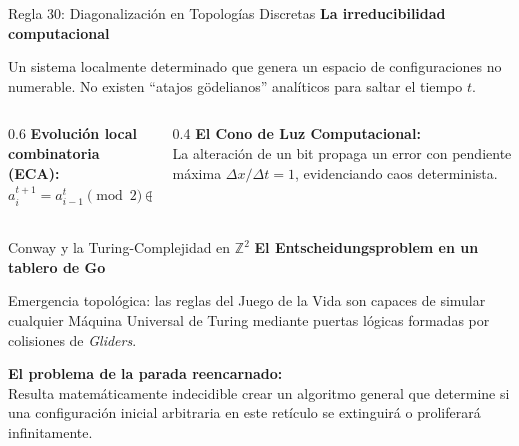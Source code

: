 \documentclass[10pt, aspectratio=169]{beamer}
\begin{document}

\begin{frame}{Regla 30: Diagonalización en Topologías Discretas}
    \vspace{0.2cm}
    \Large \textbf{La irreducibilidad computacional}
    
    \vspace{0.4cm}
    \normalsize
    Un sistema localmente determinado que genera un espacio de configuraciones no numerable. No existen ``atajos gödelianos'' analíticos para saltar el tiempo $t$.
    
    \vspace{0.4cm}
    \begin{columns}
        \begin{column}{0.6\textwidth}
            \alert{\textbf{Evolución local combinatoria (ECA):}}
            \large
            $$a_i^{t+1} = a_{i-1}^t \pmod 2 \oplus (a_i^t \lor a_{i+1}^t)$$
        \end{column}
        \begin{column}{0.4\textwidth}
            \small
            \textbf{El Cono de Luz Computacional:} \\
            La alteración de un bit propaga un error con pendiente máxima $\Delta x / \Delta t = 1$, evidenciando caos determinista.
        \end{column}
    \end{columns}
    
    \vspace{0.4cm}
\end{frame}


\begin{frame}{Conway y la Turing-Complejidad en $\mathbb{Z}^2$}
    \vspace{0.3cm}
    \Large \textbf{El Entscheidungsproblem en un tablero de Go}
    
    \vspace{0.4cm}
    \normalsize
    Emergencia topológica: las reglas del Juego de la Vida son capaces de simular cualquier Máquina Universal de Turing mediante puertas lógicas formadas por colisiones de \textit{Gliders}.
    
    \vspace{0.6cm}
    \alert{\textbf{El problema de la parada reencarnado:}} \\
    Resulta matemáticamente indecidible crear un algoritmo general que determine si una configuración inicial arbitraria en este retículo se extinguirá o proliferará infinitamente.
\end{frame}
\end{document}

